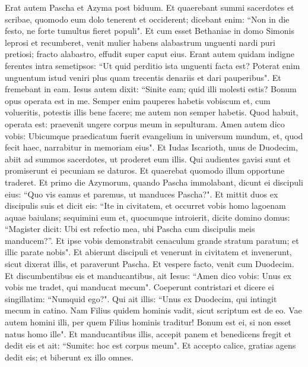 \begin{biblechapter}  
\verse Erat autem Pascha et Azyma post biduum. Et quaerebant summi sacerdotes et scribae, quomodo eum dolo tenerent et occiderent; 
\verse dicebant enim: “Non in die festo, ne forte tumultus fieret populi". 
\verse Et cum esset Bethaniae in domo Simonis leprosi et recumberet, venit mulier habens alabastrum unguenti nardi puri pretiosi; fracto alabastro, effudit super caput eius. 
\verse Erant autem quidam indigne ferentes intra semetipsos: “Ut quid perditio ista unguenti facta est? 
\verse Poterat enim unguentum istud veniri plus quam trecentis denariis et dari pauperibus". Et fremebant in eam. 
\verse Iesus autem dixit: “Sinite eam; quid illi molesti estis? Bonum opus operata est in me. 
\verse Semper enim pauperes habetis vobiscum et, cum volueritis, potestis illis bene facere; me autem non semper habetis. 
\verse Quod habuit, operata est: praevenit ungere corpus meum in sepulturam. 
\verse Amen autem dico vobis: Ubicumque praedicatum fuerit evangelium in universum mundum, et, quod fecit haec, narrabitur in memoriam eius". 
\verse Et Iudas Iscarioth, unus de Duodecim, abiit ad summos sacerdotes, ut proderet eum illis. 
\verse Qui audientes gavisi sunt et promiserunt ei pecuniam se daturos. Et quaerebat quomodo illum opportune traderet. 
\verse Et primo die Azymorum, quando Pascha immolabant, dicunt ei discipuli eius: “Quo vis eamus et paremus, ut manduces Pascha?". 
\verse Et mittit duos ex discipulis suis et dicit eis: “Ite in civitatem, et occurret vobis homo lagoenam aquae baiulans; sequimini eum 
\verse et, quocumque introierit, dicite domino domus: “Magister dicit: Ubi est refectio mea, ubi Pascha cum discipulis meis manducem?”. 
\verse Et ipse vobis demonstrabit cenaculum grande stratum paratum; et illic parate nobis". 
\verse Et abierunt discipuli et venerunt in civitatem et invenerunt, sicut dixerat illis, et paraverunt Pascha. 
\verse Et vespere facto, venit cum Duodecim. 
\verse Et discumbentibus eis et manducantibus, ait Iesus: “Amen dico vobis: Unus ex vobis me tradet, qui manducat mecum". 
\verse Coeperunt contristari et dicere ei singillatim: “Numquid ego?". 
\verse Qui ait illis: “Unus ex Duodecim, qui intingit mecum in catino. 
\verse Nam Filius quidem hominis vadit, sicut scriptum est de eo. Vae autem homini illi, per quem Filius hominis traditur! Bonum est ei, si non esset natus homo ille". 
\verse Et manducantibus illis, accepit panem et benedicens fregit et dedit eis et ait: “Sumite: hoc est corpus meum". 
\verse Et accepto calice, gratias agens dedit eis; et biberunt ex illo omnes. 

\end{biblechapter}
